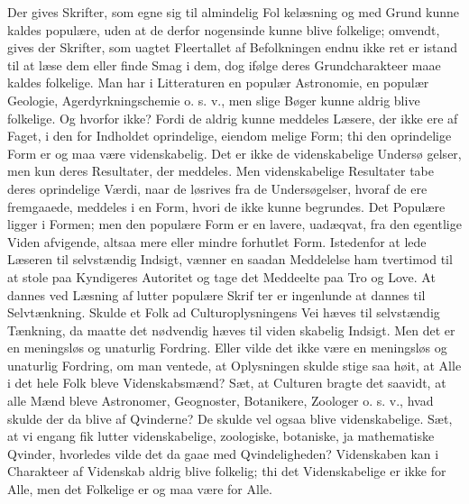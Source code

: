 \documentclass[12pt]{book}
\newcommand{\opage}[1]{\marginnote{\footnotesize\textit{[#1]}}}
\begin{document}
Der gives Skrifter, som egne sig til almindelig Fol\-%
\opage{120}\setcounter{footnote}{0}%
kelæsning og med Grund kunne kaldes populære, uden
at de derfor nogensinde kunne blive folkelige; omvendt,
gives der Skrifter, som uagtet Fleertallet af Befolkningen
endnu ikke ret er istand til at læse dem eller finde Smag
i dem, dog ifølge deres Grundcharakteer maae kaldes
folkelige. Man har i Litteraturen en populær Astronomie,
en populær Geologie, Agerdyrkningschemie o. s. v., men
slige Bøger kunne aldrig blive folkelige. Og hvorfor
ikke? Fordi de aldrig kunne meddeles Læsere, der ikke
ere af Faget, i den for Indholdet oprindelige, eiendom\-%
melige Form; thi den oprindelige Form er og maa være
videnskabelig. Det er ikke de videnskabelige Undersø\-%
gelser, men kun deres Resultater, der meddeles. Men
videnskabelige Resultater tabe deres oprindelige Værdi,
naar de løsrives fra de Undersøgelser, hvoraf de ere
fremgaaede, meddeles i en Form, hvori de ikke kunne
begrundes. Det Populære ligger i Formen; men den
populære Form er en lavere, uadæqvat, fra den egentlige
Viden afvigende, altsaa mere eller mindre forhutlet Form.
Istedenfor at lede Læseren til selvstændig Indsigt, vænner
en saadan Meddelelse ham tvertimod til at stole paa
Kyndigeres Autoritet og tage det Meddeelte paa Tro og
Love. At dannes ved Læsning af lutter populære Skrif\-%
ter er ingenlunde at dannes til Selvtænkning. Skulde et
Folk ad Culturoplysningens Vei hæves til selvstændig
Tænkning, da maatte det nødvendig hæves til viden\-%
skabelig Indsigt. Men det er en meningsløs og unaturlig
Fordring. Eller vilde det ikke være en meningsløs og
unaturlig Fordring, om man ventede, at Oplysningen
skulde stige saa høit, at Alle i det hele Folk bleve
Videnskabsmænd? Sæt, at Culturen bragte det saavidt,
at alle Mænd bleve Astronomer, Geognoster, Botanikere,
Zoologer o. s. v., hvad skulde der da blive af Qvinderne?
De skulde vel ogsaa blive videnskabelige. Sæt, at vi
\opage{121}\setcounter{footnote}{0}%
engang fik lutter videnskabelige, zoologiske, botaniske,
ja mathematiske Qvinder, hvorledes vilde det da gaae
med Qvindeligheden? Videnskaben kan i Charakteer af
Videnskab aldrig blive folkelig; thi det Videnskabelige
er ikke for Alle, men det Folkelige er og maa være
for Alle.
\end{document}
